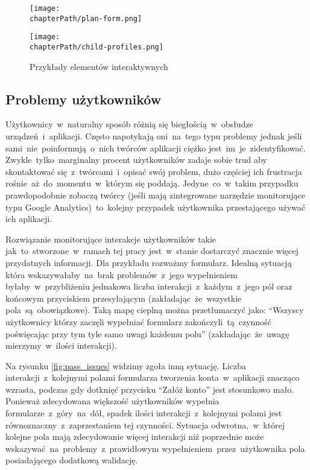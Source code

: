 \bigskip
\begin{figure}[H]
\centering
\begin{minipage}{.3\textwidth}
	\centering
	\texttt{[image: \\chapterPath/plan-form.png]}
\end{minipage}
\begin{minipage}{.4\textwidth}
	\centering
	\texttt{[image: \\chapterPath/child-profiles.png]}
\end{minipage}
\bigskip
\caption{Przykłady elementów interaktywnych}
\label{fig:interactive_areas}
\end{figure}

\subsection{Problemy użytkowników}
Użytkownicy~w~naturalny sposób różnią się biegłością~w~obsłudze urządzeń~i~aplikacji. Często napotykają oni~na~tego typu problemy jednak jeśli sami~nie~poinformują~o~nich twórców aplikacji ciężko jest~im~je~zidentyfikować. Zwykle~tylko~marginalny procent użytkowników zadaje sobie trud aby skontaktować się~z~twórcami~i~opisać swój problem, dużo częściej ich frustracja rośnie~aż~do~momentu~w~którym się poddają. Jedyne~co~w~takim przypadku prawdopodobnie zobaczą twórcy (jeśli mają zintegrowane narzędzie monitorujące typu Google Analytics)~to~kolejny przypadek użytkownika przestającego używać ich aplikacji. 

Rozwiązanie monitorujące interakcje użytkowników takie jak~to~stworzone~w~ramach tej pracy jest~w~stanie dostarczyć znacznie więcej przydatnych informacji. Dla przykładu rozważmy formularz. Idealną sytuacją która wskazywałaby~na~brak problemów~z~jego wypełnieniem byłaby~w~przybliżeniu jednakowa liczba interakcji~z~każdym~z~jego pól oraz końcowym przyciskiem przesyłającym (zakładając~że~wszystkie pola~są~obowiązkowe). Taką mapę cieplną można przetłumaczyć jako: ``Wszyscy użytkownicy którzy zaczęli wypełniać formularz zakończyli~tą~czynność poświęcając przy tym tyle samo uwagi każdemu polu'' (zakładając~że~uwagę mierzymy~w~ilości interakcji). 

Na rysunku \ref{fig:pass_issues} widzimy zgoła inną sytuację. Liczba interakcji~z~kolejnymi polami formularza tworzenia konta~w~aplikacji znacząco wzrasta, podczas gdy dotknięć przycisku ``Załóż konto'' jest stosunkowo mało. Ponieważ zdecydowana większość użytkowników wypełnia formularze~z~góry~na~dół, spadek ilości interakcji~z~kolejnymi polami jest równoznaczny~z~zaprzestaniem tej czynności. Sytuacja odwrotna,~w~której kolejne pola mają zdecydowanie więcej interakcji niż poprzednie może wskazywać~na~problemy~z~prawidłowym wypełnieniem~przez~użytkownika pola posiadającego dodatkową walidację. 

